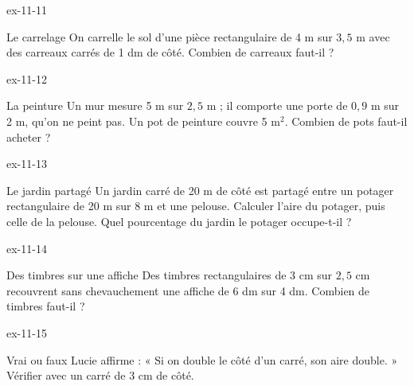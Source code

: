 \begin{blocLivre}{ex-11-11}\begin{exercice}[3]{Le carrelage}
On carrelle le sol d’une pièce rectangulaire de 4 m sur $3{,}5$ m avec des carreaux carrés de 1 dm de côté. Combien de carreaux faut-il ?
\end{exercice}\end{blocLivre}
\begin{blocLivre}{ex-11-12}\begin{exercice}[3]{La peinture}
Un mur mesure 5 m sur $2{,}5$ m ; il comporte une porte de $0{,}9$ m sur 2 m, qu’on ne peint pas. Un pot de peinture couvre 5 m$^2$. Combien de pots faut-il acheter ?
\end{exercice}\end{blocLivre}
\begin{blocLivre}{ex-11-13}\begin{exercice}[3]{Le jardin partagé}
Un jardin carré de 20 m de côté est partagé entre un potager rectangulaire de 20 m sur 8 m et une pelouse. Calculer l’aire du potager, puis celle de la pelouse. Quel pourcentage du jardin le potager occupe-t-il ?
\label{fig-ex-11-13}
\end{exercice}\end{blocLivre}
\begin{blocLivre}{ex-11-14}\begin{exercice}[3]{Des timbres sur une affiche}
Des timbres rectangulaires de 3 cm sur $2{,}5$ cm recouvrent sans chevauchement une affiche de 6 dm sur 4 dm. Combien de timbres faut-il ?
\end{exercice}\end{blocLivre}
\begin{blocLivre}{ex-11-15}\begin{exercice}[3]{Vrai ou faux}
Lucie affirme : « Si on double le côté d’un carré, son aire double. » Vérifier avec un carré de 3 cm de côté.
\end{exercice}\end{blocLivre}

\clearpage
